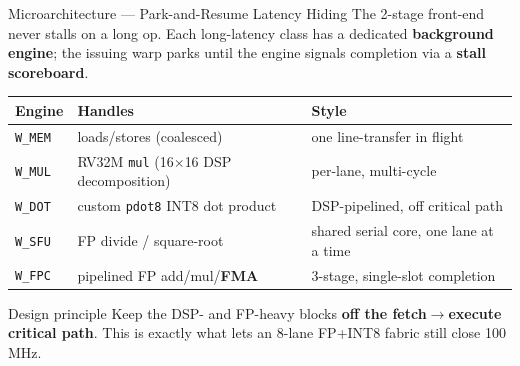 \documentclass[aspectratio=169,11pt]{beamer}
\newcommand{\hl}[1]{{\color{simtixaccent}\textbf{#1}}}
\newcommand{\navy}[1]{{\color{simtixblue}\textbf{#1}}}
\begin{document}
\begin{frame}{Microarchitecture --- Park-and-Resume Latency Hiding}
  The 2-stage front-end never stalls on a long op. Each long-latency class has a dedicated
  \hl{background engine}; the issuing warp parks until the engine signals completion via a
  \navy{stall scoreboard}.
  \vspace{0.3em}
  \begin{center}\small
  \begin{tabular}{@{}lll@{}}
    \toprule
    Engine & Handles & Style \\
    \midrule
    \texttt{W\_MEM} & loads/stores (coalesced) & one line-transfer in flight \\
    \texttt{W\_MUL} & RV32M \texttt{mul} (16$\times$16 DSP decomposition) & per-lane, multi-cycle \\
    \texttt{W\_DOT} & custom \texttt{pdot8} INT8 dot product & DSP-pipelined, off critical path \\
    \texttt{W\_SFU} & FP divide / square-root & shared serial core, one lane at a time \\
    \texttt{W\_FPC} & pipelined FP add/mul/\textbf{FMA} & 3-stage, single-slot completion \\
    \bottomrule
  \end{tabular}
  \end{center}
  \vspace{0.4em}
  \begin{block}{Design principle}
    Keep the DSP- and FP-heavy blocks \hl{off the fetch$\rightarrow$execute critical path}.
    This is exactly what lets an 8-lane FP+INT8 fabric still close 100\,MHz.
  \end{block}
\end{frame}
\end{document}

